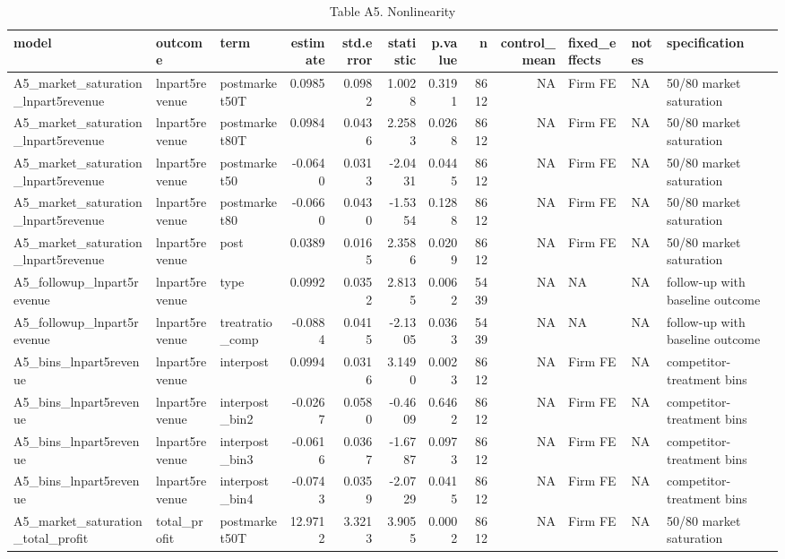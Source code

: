 \begin{table}

\caption{Table A5. Nonlinearity}
\centering
\begin{tabular}[t]{lllrrrrrrlll}
\toprule
model & outcome & term & estimate & std.error & statistic & p.value & n & control\_mean & fixed\_effects & notes & specification\\
\midrule
A5\_market\_saturation\_lnpart5revenue & lnpart5revenue & postmarket50T & 0.0985 & 0.0982 & 1.0028 & 0.3191 & 8612 & NA & Firm FE & NA & 50/80 market saturation\\
A5\_market\_saturation\_lnpart5revenue & lnpart5revenue & postmarket80T & 0.0984 & 0.0436 & 2.2583 & 0.0268 & 8612 & NA & Firm FE & NA & 50/80 market saturation\\
A5\_market\_saturation\_lnpart5revenue & lnpart5revenue & postmarket50 & -0.0640 & 0.0313 & -2.0431 & 0.0445 & 8612 & NA & Firm FE & NA & 50/80 market saturation\\
A5\_market\_saturation\_lnpart5revenue & lnpart5revenue & postmarket80 & -0.0660 & 0.0430 & -1.5354 & 0.1288 & 8612 & NA & Firm FE & NA & 50/80 market saturation\\
A5\_market\_saturation\_lnpart5revenue & lnpart5revenue & post & 0.0389 & 0.0165 & 2.3586 & 0.0209 & 8612 & NA & Firm FE & NA & 50/80 market saturation\\
\addlinespace
A5\_followup\_lnpart5revenue & lnpart5revenue & type & 0.0992 & 0.0352 & 2.8135 & 0.0062 & 5439 & NA & NA & NA & follow-up with baseline outcome\\
A5\_followup\_lnpart5revenue & lnpart5revenue & treatratio\_comp & -0.0884 & 0.0415 & -2.1305 & 0.0363 & 5439 & NA & NA & NA & follow-up with baseline outcome\\
A5\_bins\_lnpart5revenue & lnpart5revenue & interpost & 0.0994 & 0.0316 & 3.1490 & 0.0023 & 8612 & NA & Firm FE & NA & competitor-treatment bins\\
A5\_bins\_lnpart5revenue & lnpart5revenue & interpost\_bin2 & -0.0267 & 0.0580 & -0.4609 & 0.6462 & 8612 & NA & Firm FE & NA & competitor-treatment bins\\
A5\_bins\_lnpart5revenue & lnpart5revenue & interpost\_bin3 & -0.0616 & 0.0367 & -1.6787 & 0.0973 & 8612 & NA & Firm FE & NA & competitor-treatment bins\\
\addlinespace
A5\_bins\_lnpart5revenue & lnpart5revenue & interpost\_bin4 & -0.0743 & 0.0359 & -2.0729 & 0.0415 & 8612 & NA & Firm FE & NA & competitor-treatment bins\\
A5\_market\_saturation\_total\_profit & total\_profit & postmarket50T & 12.9712 & 3.3213 & 3.9055 & 0.0002 & 8612 & NA & Firm FE & NA & 50/80 market saturation\\

\end{tabular}
\end{table}
